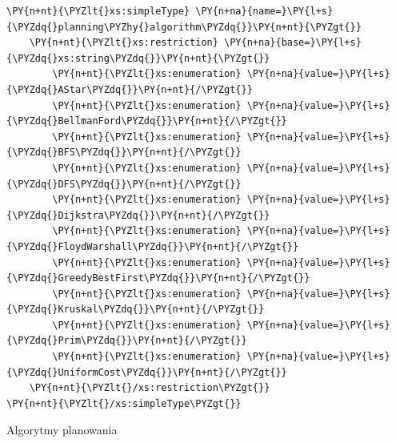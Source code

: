 \begin{program}
\begin{code}
\begin{Verbatim}[commandchars=\\\{\}]
\PY{n+nt}{\PYZlt{}xs:simpleType} \PY{n+na}{name=}\PY{l+s}{\PYZdq{}planning\PYZhy{}algorithm\PYZdq{}}\PY{n+nt}{\PYZgt{}}
	\PY{n+nt}{\PYZlt{}xs:restriction} \PY{n+na}{base=}\PY{l+s}{\PYZdq{}xs:string\PYZdq{}}\PY{n+nt}{\PYZgt{}}
		\PY{n+nt}{\PYZlt{}xs:enumeration} \PY{n+na}{value=}\PY{l+s}{\PYZdq{}AStar\PYZdq{}}\PY{n+nt}{/\PYZgt{}}
		\PY{n+nt}{\PYZlt{}xs:enumeration} \PY{n+na}{value=}\PY{l+s}{\PYZdq{}BellmanFord\PYZdq{}}\PY{n+nt}{/\PYZgt{}}
		\PY{n+nt}{\PYZlt{}xs:enumeration} \PY{n+na}{value=}\PY{l+s}{\PYZdq{}BFS\PYZdq{}}\PY{n+nt}{/\PYZgt{}}
		\PY{n+nt}{\PYZlt{}xs:enumeration} \PY{n+na}{value=}\PY{l+s}{\PYZdq{}DFS\PYZdq{}}\PY{n+nt}{/\PYZgt{}}
		\PY{n+nt}{\PYZlt{}xs:enumeration} \PY{n+na}{value=}\PY{l+s}{\PYZdq{}Dijkstra\PYZdq{}}\PY{n+nt}{/\PYZgt{}}
		\PY{n+nt}{\PYZlt{}xs:enumeration} \PY{n+na}{value=}\PY{l+s}{\PYZdq{}FloydWarshall\PYZdq{}}\PY{n+nt}{/\PYZgt{}}
		\PY{n+nt}{\PYZlt{}xs:enumeration} \PY{n+na}{value=}\PY{l+s}{\PYZdq{}GreedyBestFirst\PYZdq{}}\PY{n+nt}{/\PYZgt{}}
		\PY{n+nt}{\PYZlt{}xs:enumeration} \PY{n+na}{value=}\PY{l+s}{\PYZdq{}Kruskal\PYZdq{}}\PY{n+nt}{/\PYZgt{}}
		\PY{n+nt}{\PYZlt{}xs:enumeration} \PY{n+na}{value=}\PY{l+s}{\PYZdq{}Prim\PYZdq{}}\PY{n+nt}{/\PYZgt{}}
		\PY{n+nt}{\PYZlt{}xs:enumeration} \PY{n+na}{value=}\PY{l+s}{\PYZdq{}UniformCost\PYZdq{}}\PY{n+nt}{/\PYZgt{}}
	\PY{n+nt}{\PYZlt{}/xs:restriction\PYZgt{}}
\PY{n+nt}{\PYZlt{}/xs:simpleType\PYZgt{}}
\end{Verbatim}
\end{code}
\caption{Algorytmy planowania}
\end{program}


